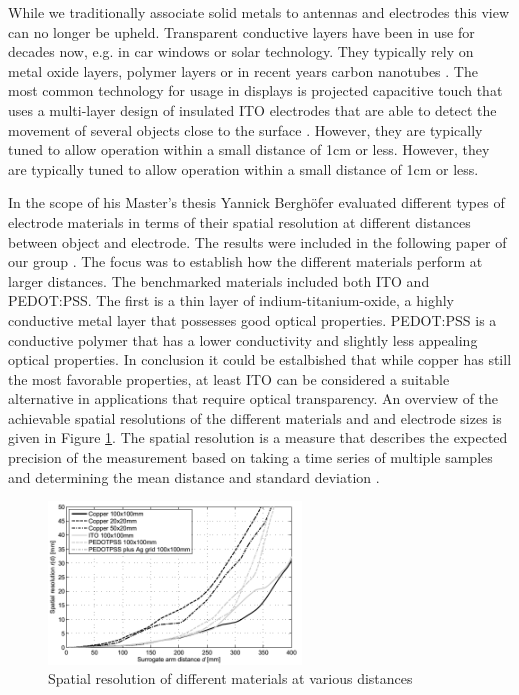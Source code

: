 While we traditionally associate solid metals to antennas and electrodes this view can no longer be upheld. Transparent conductive layers have been in use for decades now, e.g. in car windows or solar technology. They typically rely on metal oxide layers, polymer layers or in recent years carbon nanotubes \cite{Moon2005}. The most common technology for usage in displays is projected capacitive touch that uses a multi-layer design of insulated ITO electrodes that are able to detect the movement of several objects close to the surface \cite{Barrett2010}. However, they are typically tuned to allow operation within a small distance of 1cm or less. However, they are typically tuned to allow operation within a small distance of 1cm or less. 

In the scope of his Master's thesis Yannick Berghöfer evaluated different types of electrode materials in terms of their spatial resolution at different distances between object and electrode. The results were included in the following paper of our group \cite{grosse2013opencapsense}. The focus was to establish how the different materials perform at larger distances. The benchmarked materials included both ITO and PEDOT:PSS. The first is a thin layer of indium-titanium-oxide, a highly conductive metal layer that possesses good optical properties. PEDOT:PSS is a conductive polymer that has a lower conductivity and slightly less appealing optical properties. In conclusion it could be estalbished that while copper has still the most favorable properties, at least ITO can be considered a suitable alternative in applications that require optical transparency. An overview of the achievable spatial resolutions of the different materials and and electrode sizes is given in Figure \ref{fig:cap_spatial_resolution}.  The spatial resolution is a measure that describes the expected precision of the measurement based on taking a time series of multiple samples and determining the mean distance and standard deviation \cite{grosse2013opencapsense}.
\begin{figure} [h]
\centering
\includegraphics[width=0.6\textwidth]{images/cap_spatial_resolution.png} 
\caption{Spatial resolution of different materials at various distances \cite{grosse2013opencapsense}}
\label{fig:cap_spatial_resolution}
\end{figure}

